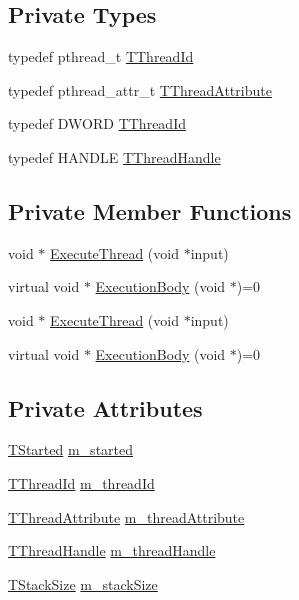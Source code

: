 \subsection*{Private Types}
\begin{DoxyCompactItemize}
\item 
typedef pthread\-\_\-t \hyperlink{class_thread_base_af8ec97aa7d89f9a4605a1c6c60777d5d}{T\-Thread\-Id}
\item 
typedef pthread\-\_\-attr\-\_\-t \hyperlink{class_thread_base_adea5ffdf2c74b95dbfee5148248f93b8}{T\-Thread\-Attribute}
\item 
typedef D\-W\-O\-R\-D \hyperlink{class_thread_base_a76da3758dcb9858188c493eb9b811f3d}{T\-Thread\-Id}
\item 
typedef H\-A\-N\-D\-L\-E \hyperlink{class_thread_base_ad87b599650c2062b6ff7e54934da7e2b}{T\-Thread\-Handle}
\end{DoxyCompactItemize}
\subsection*{Private Member Functions}
\begin{DoxyCompactItemize}
\item 
void $\ast$ \hyperlink{class_thread_base_a844dd13473fee9283197b3905a81da45}{Execute\-Thread} (void $\ast$input)
\item 
virtual void $\ast$ \hyperlink{class_thread_base_a2cbbb5fb63f5e92d32085b6e874b6f29}{Execution\-Body} (void $\ast$)=0
\item 
void $\ast$ \hyperlink{class_thread_base_a844dd13473fee9283197b3905a81da45}{Execute\-Thread} (void $\ast$input)
\item 
virtual void $\ast$ \hyperlink{class_thread_base_a2cbbb5fb63f5e92d32085b6e874b6f29}{Execution\-Body} (void $\ast$)=0
\end{DoxyCompactItemize}
\subsection*{Private Attributes}
\begin{DoxyCompactItemize}
\item 
\hyperlink{class_thread_base_ad8b410e3bc7320addea3c5b56ff6c985}{T\-Started} \hyperlink{class_thread_base_a5e2958ae98b989268d1e2be629789d64}{m\-\_\-started}
\item 
\hyperlink{class_thread_base_af8ec97aa7d89f9a4605a1c6c60777d5d}{T\-Thread\-Id} \hyperlink{class_thread_base_ae8574271bdcbfd80cbdde64c77bc7148}{m\-\_\-thread\-Id}
\item 
\hyperlink{class_thread_base_adea5ffdf2c74b95dbfee5148248f93b8}{T\-Thread\-Attribute} \hyperlink{class_thread_base_ad0d98c6f93707aef346cc66d8de78729}{m\-\_\-thread\-Attribute}
\item 
\hyperlink{class_thread_base_ad87b599650c2062b6ff7e54934da7e2b}{T\-Thread\-Handle} \hyperlink{class_thread_base_a4f279b94eef423109969f69fadd9e674}{m\-\_\-thread\-Handle}
\item 
\hyperlink{class_thread_base_af45bd74387b409e15989f7eddbaf3718}{T\-Stack\-Size} \hyperlink{class_thread_base_a9c8b3446d099074f0f1608e5246e137d}{m\-\_\-stack\-Size}
\end{DoxyCompactItemize}
